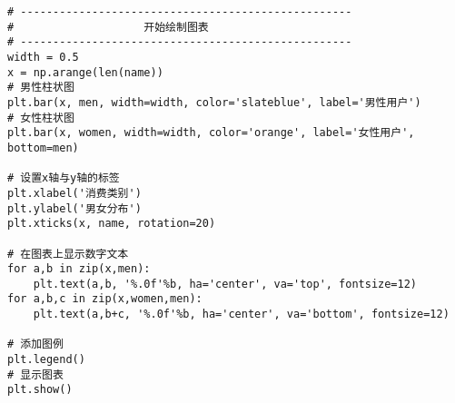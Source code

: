 \documentclass[a4paper]{ctexart}    %
\begin{document}
\newpage
\begin{tcolorbox}[
         colback=red!5!white,
         colframe=teal,
         title=\textbf{seaborn (堆叠)柱状图2/2}
    ]
\begin{verbatim}
# ---------------------------------------------------
#                    开始绘制图表
# ---------------------------------------------------
width = 0.5
x = np.arange(len(name))
# 男性柱状图
plt.bar(x, men, width=width, color='slateblue', label='男性用户')
# 女性柱状图
plt.bar(x, women, width=width, color='orange', label='女性用户', bottom=men)

# 设置x轴与y轴的标签
plt.xlabel('消费类别')
plt.ylabel('男女分布')
plt.xticks(x, name, rotation=20)

# 在图表上显示数字文本
for a,b in zip(x,men):
    plt.text(a,b, '%.0f'%b, ha='center', va='top', fontsize=12)
for a,b,c in zip(x,women,men):
    plt.text(a,b+c, '%.0f'%b, ha='center', va='bottom', fontsize=12)

# 添加图例
plt.legend()
# 显示图表
plt.show()
\end{verbatim}
\end{tcolorbox}
\end{document}
